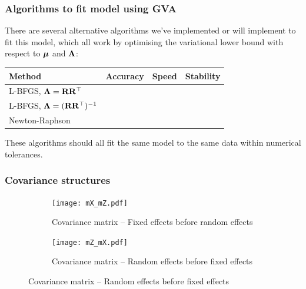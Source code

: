 \documentclass{beamer}
\begin{document}
\begin{frame}
	\frametitle{Algorithms to fit model using GVA}
	There are several alternative algorithms we've implemented or will implement
	to fit this model, which all work by optimising the variational lower bound with respect to
	${\boldsymbol \mu}$ and ${\boldsymbol \Lambda}$:
	
	\begin{tabular}{|l|ccc|}
		\hline
		Method & Accuracy & Speed & Stability \\
		\hline
		L-BFGS, ${\boldsymbol \Lambda} = {\bf R} {\bf R}^\top$ & \checkmark & & \checkmark \\
		L-BFGS, ${\boldsymbol \Lambda} = ({\bf R} {\bf R}^\top)^{-1}$ & \checkmark & \checkmark & \checkmark \\
		Newton-Raphson & \checkmark & \checkmark  &\\
		\hline
	\end{tabular}	

	These algorithms should all fit the same model to the same data
	within numerical tolerances.
\end{frame}

\begin{frame}
\frametitle{Covariance structures}

	\begin{figure}
		\begin{subfigure}{0.4\textwidth}
			\texttt{[image: mX\_mZ.pdf]}
			\caption{Covariance matrix -- Fixed effects before random effects}
		\end{subfigure}
		\begin{subfigure}{0.4\textwidth}
			\texttt{[image: mZ\_mX.pdf]}
			\caption{Covariance matrix -- Random effects before fixed effects}
		\end{subfigure}
	\end{figure}
\end{frame}
\end{document}
